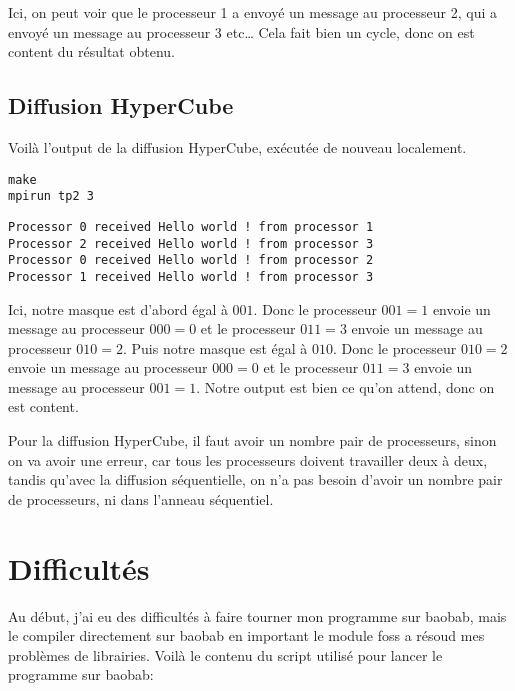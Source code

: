 \documentclass[11pt]{article}
\begin{document}
Ici, on peut voir que le processeur 1 a envoyé un message au processeur 2, qui a envoyé un message au processeur 3 etc\ldots{} Cela fait bien un cycle, donc on est content du résultat obtenu.

\subsection{Diffusion HyperCube}
\label{sec:org0c30591}

Voilà l'output de la diffusion HyperCube, exécutée de nouveau localement.
\begin{verbatim}
make
mpirun tp2 3
\end{verbatim}

\begin{verbatim}
Processor 0 received Hello world ! from processor 1
Processor 2 received Hello world ! from processor 3
Processor 0 received Hello world ! from processor 2
Processor 1 received Hello world ! from processor 3
\end{verbatim}



Ici, notre masque est d'abord égal à \(001\). Donc le processeur \(001 = 1\) envoie un message au processeur \(000 = 0\) et le processeur \(011 = 3\) envoie un message au processeur \(010 = 2\).
Puis notre masque est égal à \(010\). Donc le processeur \(010 = 2\) envoie un message au processeur \(000 = 0\) et le processeur \(011 = 3\) envoie un message au processeur \(001 = 1\).
Notre output est bien ce qu'on attend, donc on est content.

Pour la diffusion HyperCube, il faut avoir un nombre pair de processeurs, sinon on va avoir une erreur, car tous les processeurs doivent travailler deux à deux, tandis qu'avec la diffusion séquentielle, on n'a pas besoin d'avoir un nombre pair de processeurs, ni dans l'anneau séquentiel.

\section{Difficultés}
\label{sec:org6a16459}

Au début, j'ai eu des difficultés à faire tourner mon programme sur baobab, mais le compiler directement sur baobab en important le module foss a résoud mes problèmes de librairies.
Voilà le contenu du script utilisé pour lancer le programme sur baobab:
\end{document}
